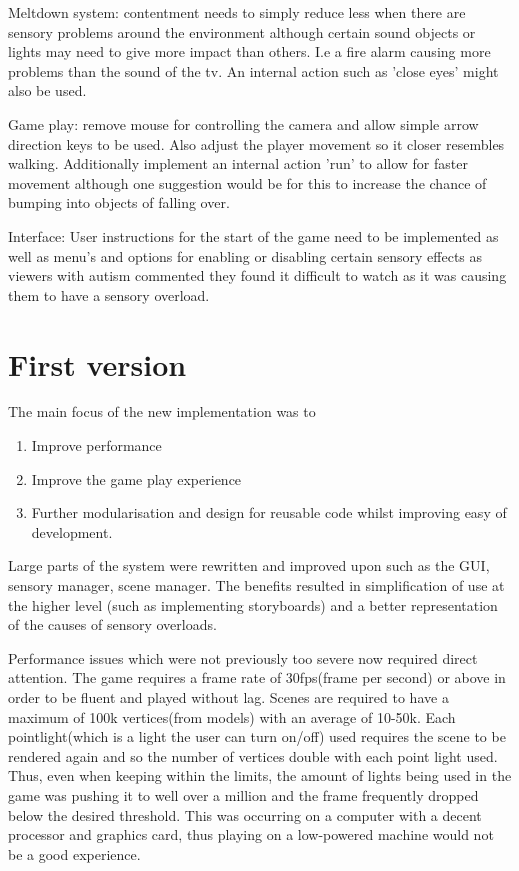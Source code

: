\documentclass[11pt]{report}
\begin{document}
Meltdown system: contentment needs to simply reduce less when there are sensory problems around the environment although certain sound objects or lights may need to give more impact than others. I.e a fire alarm causing more problems than the sound of the tv. An internal action such as 'close eyes' might also be used. 

Game play: remove mouse for controlling the camera and allow simple arrow direction keys to be used. Also adjust the player movement so it closer resembles walking. Additionally implement an internal action 'run' to allow for faster movement although one suggestion would be for this to increase the chance of bumping into objects of falling over. 

Interface: User instructions for the start of the game need to be implemented as well as menu's and options for enabling or disabling certain sensory effects as viewers with autism commented they found it difficult to watch as it was causing them to have a sensory overload. 

\chapter{First version}
The main focus of the new implementation was to 

\begin{enumerate}
\item Improve performance
\item Improve the game play experience
\item Further modularisation and design for reusable code whilst improving easy of development. 
\end{enumerate}

Large parts of the system were rewritten and improved upon such as the GUI, sensory manager, scene manager. The benefits resulted in simplification of use at the higher level (such as implementing storyboards) and a better representation of the causes of sensory overloads.

Performance issues which were not previously too severe now required direct attention. The game requires a frame rate of 30fps(frame per second) or above in order to be fluent and played without lag. Scenes are required to have a maximum of 100k vertices(from models) with an average of 10-50k. Each pointlight(which is a light the user can turn on/off) used requires the scene to be rendered again and so the number of vertices double with each point light used. Thus, even when keeping within the limits, the amount of lights being used in the game was pushing it to well over a million and the frame frequently dropped below the desired threshold. This was occurring on a computer with a decent processor and graphics card, thus playing on a low-powered machine would not be a good experience.  
\end{document}
